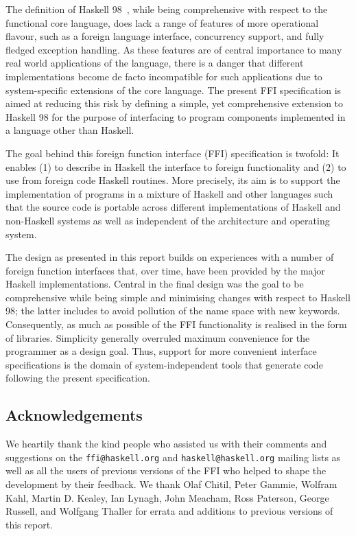 \documentclass[a4paper,twoside]{article}
\newcommand{\code}[1]{\texttt{#1}}      %
\begin{document}
The definition of Haskell 98~\cite{haskell98}, while being comprehensive with
respect to the functional core language, does lack a range of features of more
operational flavour, such as a foreign language interface, concurrency
support, and fully fledged exception handling.  As these features are of
central importance to many real world applications of the language, there is a
danger that different implementations become de facto incompatible for such
applications due to system-specific extensions of the core language.  The
present FFI specification is aimed at reducing this risk by defining a simple,
yet comprehensive extension to Haskell 98 for the purpose of interfacing to
program components implemented in a language other than Haskell.

The goal behind this foreign function interface (FFI) specification is
twofold: It enables (1) to describe in Haskell the interface to foreign
functionality and (2) to use from foreign code Haskell routines.  More
precisely, its aim is to support the implementation of programs in a mixture
of Haskell and other languages such that the source code is portable across
different implementations of Haskell and non-Haskell systems as well as
independent of the architecture and operating system.

The design as presented in this report builds on experiences with a number of
foreign function interfaces that, over time, have been provided by the major
Haskell implementations.  Central in the final design was the goal to be
comprehensive while being simple and minimising changes with respect to
Haskell 98; the latter includes to avoid pollution of the name space with new
keywords.  Consequently, as much as possible of the FFI functionality is
realised in the form of libraries.  Simplicity generally overruled maximum
convenience for the programmer as a design goal.  Thus, support for more
convenient interface specifications is the domain of system-independent tools
that generate code following the present specification.

\subsection*{Acknowledgements}

We heartily thank the kind people who assisted us with their comments and
suggestions on the \code{ffi@haskell.org} and \code{haskell@haskell.org}
mailing lists as well as all the users of previous versions of the FFI who
helped to shape the development by their feedback.  We thank Olaf Chitil,
Peter Gammie, Wolfram Kahl, Martin D. Kealey, Ian Lynagh, John Meacham, Ross
Paterson, George Russell, and Wolfgang Thaller for errata and additions to
previous versions of this report.
\end{document}
